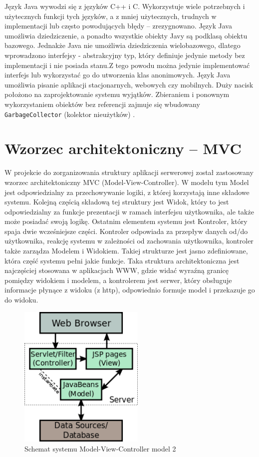 \documentclass[eng,printmode,oneside]{mgr}
\begin{document}
Język Java wywodzi się z języków C++ i C. Wykorzystuje wiele potrzebnych i
użytecznych funkcji tych języków, a z mniej użytecznych, trudnych w
implementacji lub często powodujących błędy -- zrezygnowano. Język Java
umożliwia dziedziczenie, a ponadto wszystkie obiekty Javy są podklasą obiektu
bazowego. Jednakże Java nie umożliwia dziedziczenia wielobazowego, dlatego wprowadzono interfejsy -
abstrakcyjny typ, który definiuje jedynie metody bez implementacji i nie
posiada stanu.Z tego powodu można jedynie implementować
interfejs lub wykorzystać go do utworzenia klas anonimowych. Język Java
umożliwia pisanie aplikacji stacjonarnych, webowych czy mobilnych. Duży nacisk
położono na zaprojektowanie systemu wyjątków. Zbieraniem i ponownym
wykorzystaniem obiektów bez referencji zajmuje się wbudowany
\texttt{GarbageCollector} (kolektor nieużytków) \cite{java.doc}.

\section{Wzorzec architektoniczny -- MVC}

W projekcie do zorganizowania struktury aplikacji serwerowej został zastosowany
wzorzec architektoniczny MVC (Model-View-Controller). W modelu tym Model jest
odpowiedzialny za przechowywanie logiki, z której korzystają inne składowe
systemu. Kolejną częścią składową tej struktury jest Widok, który to jest
odpowiedzialny za funkcje prezentacji w ramach interfejsu użytkownika, ale
także może posiadać swoją logikę. Ostatnim elementem systemu jest Kontroler,
który spaja dwie wcześniejsze części. Kontroler odpowiada za przepływ danych
od/do użytkownika, reakcję systemu w zależności od zachowania użytkownika,
kontroler także zarządza Modelem i Widokiem. Takiej strukturze jest jasno
zdefiniowane, która część systemu pełni jakie funkcje. Taka struktura
architektoniczna jest najczęściej stosowana w aplikacjach WWW, gdzie widać
wyraźną granicę pomiędzy widokiem i modelem, a kontrolerem jest serwer, który
obsługuje informacje płynące z widoku (z http), odpowiednio formuje model i
przekazuje go do widoku. \cite{java.mvc}

\begin{figure}[ht!]
\centering
\includegraphics[width=60mm]{jspModel.png}
\caption{Schemat systemu Model-View-Controller model 2\cite{java.mvc.grafika}}
\label{fig:MVC2}
\end{figure}
\end{document}
